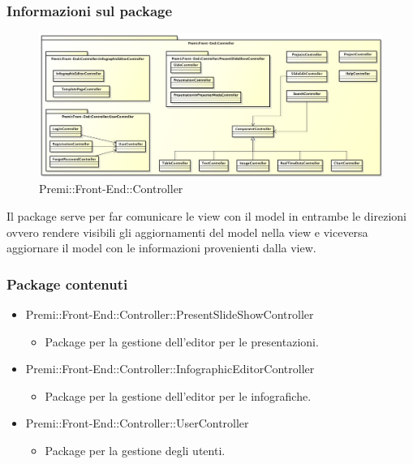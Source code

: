\subsubsection*{Informazioni sul package}
	\begin{figure}[h]
		\centering
		\includegraphics[width=1.0\linewidth]{img/front-end_controller}
		\caption[Premi::Front-End::Controller]{Premi::Front-End::Controller}
	\end{figure}
	Il package serve per far comunicare le view con il model in entrambe le direzioni ovvero rendere visibili gli aggiornamenti del model nella view e viceversa aggiornare il model con le informazioni provenienti dalla view.
	\subsubsection*{Package contenuti}
		\begin{itemize}
		 \item Premi::Front-End::Controller::PresentSlideShowController
		 \begin{itemize}
		    \item Package per la gestione dell'editor per le presentazioni.
		 \end{itemize}
		 \item Premi::Front-End::Controller::InfographicEditorController
		 \begin{itemize}
		    \item Package per la gestione dell'editor per le infografiche.
		 \end{itemize}
		 \item Premi::Front-End::Controller::UserController
		 \begin{itemize}
		    \item Package per la gestione degli utenti.
		 \end{itemize}
		\end{itemize}
